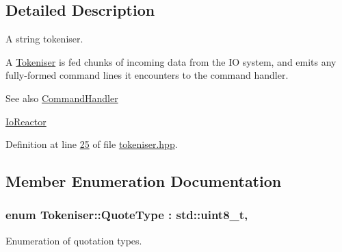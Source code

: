 \subsection{Detailed Description}
A string tokeniser. 

A \hyperlink{classTokeniser}{Tokeniser} is fed chunks of incoming data from the I\+O system, and emits any fully-\/formed command lines it encounters to the command handler.

\begin{DoxySeeAlso}{See also}
\hyperlink{classCommandHandler}{Command\+Handler} 

\hyperlink{classIoReactor}{Io\+Reactor} 
\end{DoxySeeAlso}


Definition at line \hyperlink{tokeniser_8hpp_source_l00025}{25} of file \hyperlink{tokeniser_8hpp_source}{tokeniser.\+hpp}.



\subsection{Member Enumeration Documentation}
\hypertarget{classTokeniser_a71d622e60fae9d6c36c96ba69a4f62e4}{
\subsubsection[{Quote\+Type}]{\setlength{\rightskip}{0pt plus 5cm}enum {\bf Tokeniser\+::\+Quote\+Type} \+: std\+::uint8\+\_\+t\hspace{0.3cm}{\ttfamily [strong]}, {\ttfamily [private]}}}\label{classTokeniser_a71d622e60fae9d6c36c96ba69a4f62e4}


Enumeration of quotation types. 

